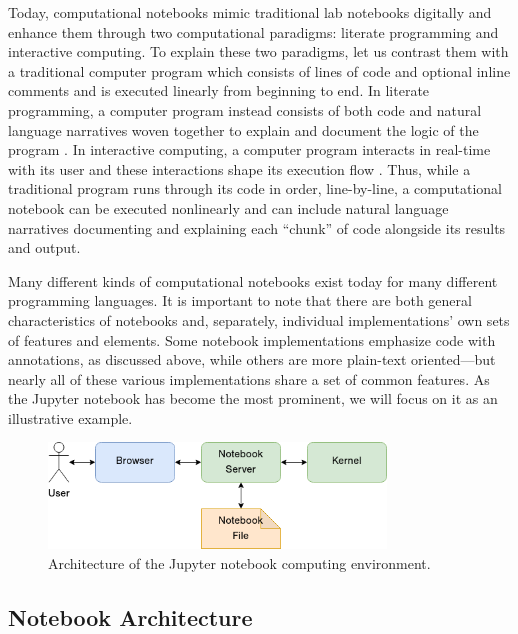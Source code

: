 \documentclass[11pt,letterpaper]{article}
\begin{document}
Today, computational notebooks mimic traditional lab notebooks digitally and enhance them through two computational paradigms: literate programming and interactive computing. To explain these two paradigms, let us contrast them with a traditional computer program which consists of lines of code and optional inline comments and is executed linearly from beginning to end. In literate programming, a computer program instead consists of both code and natural language narratives woven together to explain and document the logic of the program \citep{knuth_literate_1992}. In interactive computing, a computer program interacts in real-time with its user and these interactions shape its execution flow \citep{perez_ipython:_2007}. Thus, while a traditional program runs through its code in order, line-by-line, a computational notebook can be executed nonlinearly and can include natural language narratives documenting and explaining each \enquote{chunk} of code alongside its results and output.

Many different kinds of computational notebooks exist today for many different programming languages. It is important to note that there are both general characteristics of notebooks and, separately, individual implementations' own sets of features and elements. Some notebook implementations emphasize code with annotations, as discussed above, while others are more plain-text oriented---but nearly all of these various implementations share a set of common features. As the Jupyter notebook has become the most prominent, we will focus on it as an illustrative example.

\begin{figure}[tbp]
	\centering
	\includegraphics[width=0.8\textwidth]{notebook-architecture.png}
	\caption{Architecture of the Jupyter notebook computing environment.}
	\label{fig:notebook_architecture}
\end{figure}

\subsection{Notebook Architecture}
\end{document}
